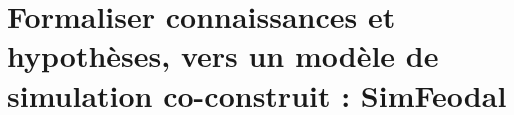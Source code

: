 \setcounter{chapter}{1}
\graphicspath{{chap2/}}

\chapter{Formaliser connaissances et hypothèses, vers un modèle de simulation co-construit : SimFeodal }
\label{chap:chap2}
%
\setcounter{minitocdepth}{1}
\vfill
{}
\minitoc
{}
\clearpage
{}




